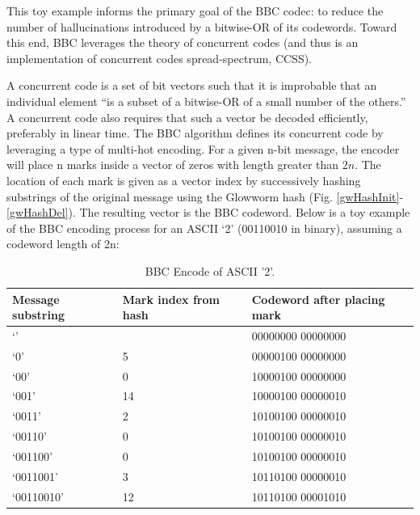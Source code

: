 \documentclass[conference]{IEEEtran}
\begin{document}
This toy example informs the primary goal of the BBC codec: to reduce the number of hallucinations introduced by a bitwise-OR of its codewords. Toward this end, BBC leverages the theory of concurrent codes (and thus is an implementation of concurrent codes spread-spectrum, CCSS).

A concurrent code is a set of bit vectors such that it is improbable that an individual element “is a subset of a bitwise-OR of a small number of the others.” A concurrent code also requires that such a vector be decoded efficiently, preferably in linear time. The BBC algorithm defines its concurrent code by leveraging a type of multi-hot encoding. For a given n-bit message, the encoder will place n marks inside a vector of zeros with length greater than $2n$. The location of each mark is given as a vector index by successively hashing substrings of the original message using the Glowworm hash (Fig. \ref{gwHashInit}-\ref{gwHashDel}). The resulting vector is the BBC codeword. Below is a toy example of the BBC encoding process for an ASCII ‘2’ (00110010 in binary), assuming a codeword length of 2n:

\begin{table}[h]
    \centering
    \caption{BBC Encode of ASCII '2'. }
    \label{BBCencode2}
    
    \begin{center}
    \begin{tabular}{ | m{4.5em} | m{1.3cm}| m{2.35cm} | } 
      \hline
      Message substring & Mark index from hash & Codeword after  \hspace{1cm}  placing mark \\ 
      \hline
      ‘’ &  &  00000000  00000000\\ 
      \hline
      ‘0’ & 5 &  00000100  00000000\\ 
       \hline
      ‘00’ & 0 &  10000100  00000000\\ 
      \hline
      ‘001’ & 14 & 10000100  00000010 \\ 
      \hline
       ‘0011’ & 2 & 10100100  00000010\\
       \hline
       ‘00110’ & 0 & 10100100  00000010\\
       \hline
       ‘001100’ & 0 & 10100100  00000010\\
       \hline
       ‘0011001' & 3 & 10110100  00000010\\
       \hline
       ‘00110010’ & 12 & 10110100  00001010\\
      \hline
    \end{tabular}
    \end{center}
\end{table}
\end{document}

